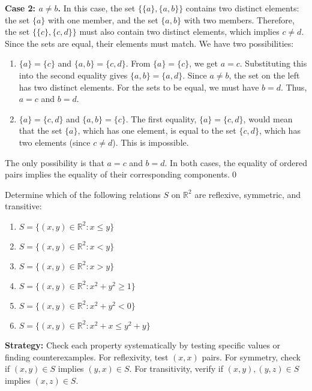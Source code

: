 \textbf{Case 2: $a \neq b$.}
In this case, the set $\{\{a\}, \{a, b\}\}$ contains two distinct elements: the set $\{a\}$ with one member, and the set $\{a, b\}$ with two members. Therefore, the set $\{\{c\}, \{c, d\}\}$ must also contain two distinct elements, which implies $c \neq d$.
Since the sets are equal, their elements must match. We have two possibilities:
\begin{enumerate}
\item $\{a\} = \{c\}$ and $\{a, b\} = \{c, d\}$.
From $\{a\} = \{c\}$, we get $a=c$. Substituting this into the second equality gives $\{a, b\} = \{a, d\}$. Since $a \neq b$, the set on the left has two distinct elements. For the sets to be equal, we must have $b=d$. Thus, $a=c$ and $b=d$.
\item $\{a\} = \{c, d\}$ and $\{a, b\} = \{c\}$.
The first equality, $\{a\} = \{c, d\}$, would mean that the set $\{a\}$, which has one element, is equal to the set $\{c, d\}$, which has two elements (since $c \neq d$). This is impossible.
\end{enumerate}
The only possibility is that $a=c$ and $b=d$. In both cases, the equality of ordered pairs implies the equality of their corresponding components.\qed



\begin{problembox}
Determine which of the following relations $S$ on $\mathbb{R}^2$ are reflexive, symmetric, and transitive:
\begin{enumerate}[label=(\alph*)]
\item $S = \{(x,y) \in \mathbb{R}^2 : x \leq y\}$
\item $S = \{(x,y) \in \mathbb{R}^2 : x < y\}$
\item $S = \{(x,y) \in \mathbb{R}^2 : x > y\}$
\item $S = \{(x,y) \in \mathbb{R}^2 : x^2 + y^2 \geq 1\}$
\item $S = \{(x,y) \in \mathbb{R}^2 : x^2 + y^2 < 0\}$
\item $S = \{(x,y) \in \mathbb{R}^2 : x^2 + x \leq y^2 + y\}$
\end{enumerate}
\end{problembox}

\noindent\textbf{Strategy:} Check each property systematically by testing specific values or finding counterexamples. For reflexivity, test $(x,x)$ pairs. For symmetry, check if $(x,y) \in S$ implies $(y,x) \in S$. For transitivity, verify if $(x,y), (y,z) \in S$ implies $(x,z) \in S$.

